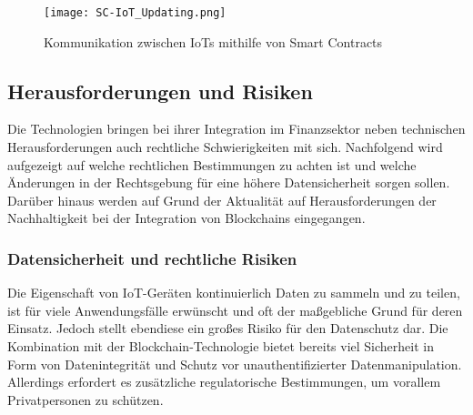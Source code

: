 \begin{figure}[!h]
    \begin{center}
        \texttt{[image: SC-IoT\_Updating.png]}
    \end{center}
    \caption{Kommunikation zwischen IoTs mithilfe von Smart Contracts}
    \label{fig:SC-IoT_Update}
\end{figure}









\subsection{Herausforderungen und Risiken}
Die Technologien bringen bei ihrer Integration im Finanzsektor neben technischen Herausforderungen 
auch rechtliche Schwierigkeiten mit sich. Nachfolgend wird aufgezeigt auf welche rechtlichen Bestimmungen
zu achten ist und welche Änderungen in der Rechtsgebung für eine höhere Datensicherheit sorgen sollen.
Darüber hinaus werden auf Grund der Aktualität auf Herausforderungen der Nachhaltigkeit bei der Integration
von Blockchains eingegangen.


\subsubsection{Datensicherheit und rechtliche Risiken}
Die Eigenschaft von IoT-Geräten kontinuierlich Daten zu sammeln und zu teilen, ist für viele 
Anwendungsfälle erwünscht und oft der ma\ss gebliche Grund für deren Einsatz. 
Jedoch stellt ebendiese ein gro\ss es Risiko für den Datenschutz dar. Die Kombination mit der 
Blockchain-Technologie bietet bereits viel Sicherheit in Form von Datenintegrität und Schutz vor 
unauthentifizierter Datenmanipulation. Allerdings erfordert es zusätzliche regulatorische Bestimmungen, 
um vorallem Privatpersonen zu schützen.

